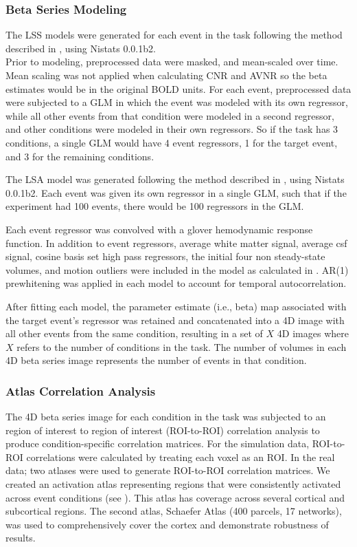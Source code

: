 \documentclass[10pt,letterpaper]{article}
\begin{document}
\subsubsection*{Beta Series Modeling}
\label{methods:bsc_model}

The LSS models were generated for each event in
the task following the method described in \cite{Turner2012a}, using
Nistats 0.0.1b2.\\
Prior to modeling, preprocessed data were masked, and mean-scaled over
time.
Mean scaling was not applied when calculating CNR and AVNR so the
beta estimates would be in the original BOLD units.
For each event, preprocessed data were subjected to a GLM
in which the event was modeled with its own regressor, while
all other events from that condition were modeled in a second regressor,
and other conditions were modeled in their own regressors.
So if the task has 3 conditions, 
a single GLM would have 4 event regressors, 1 for the target
event, and 3 for the remaining conditions.

The LSA model was generated following the method described in
\cite[Rissman (2004)]{Rissman2004}, using Nistats 0.0.1b2.
Each event was given its own regressor in a single GLM, such that
if the experiment had 100 events, there would be 100 regressors in the GLM.

Each event regressor was convolved with a glover hemodynamic response
function\cite{Glover1999}.
In addition to event regressors, average white matter signal, average csf signal,
cosine basis set high pass regressors, the initial four non steady-state volumes, 
and motion outliers were included
in the model as calculated in .
AR(1) prewhitening was applied in each model to account
for temporal autocorrelation.

After fitting each model, the parameter estimate (i.e., beta) map
associated with the target event's regressor was retained and
concatenated into a 4D image with all other events from the same
condition, resulting in a set of $X$ 4D images where $X$ refers to the
number of conditions in the task.
The number of volumes in each 4D beta series image
represents the number of events in that condition.

\subsubsection*{Atlas Correlation Analysis}
\label{methods:atlas-corr-analysis}

The 4D beta series image for each condition in the task was subjected to
an region of interest to region of interest (ROI-to-ROI) correlation analysis
to produce condition-specific correlation matrices.
For the simulation data, ROI-to-ROI correlations were calculated by
treating each voxel as an ROI.
In the real data; two atlases were used to generate ROI-to-ROI correlation matrices.
We created an activation atlas representing regions that were
consistently activated across event conditions (see ).
This atlas has coverage across several cortical and subcortical regions.
The second atlas, Schaefer Atlas (400 parcels, 17 networks)\cite{Schaefer2017}, was
used to comprehensively cover the cortex and demonstrate robustness of results.
\end{document}
